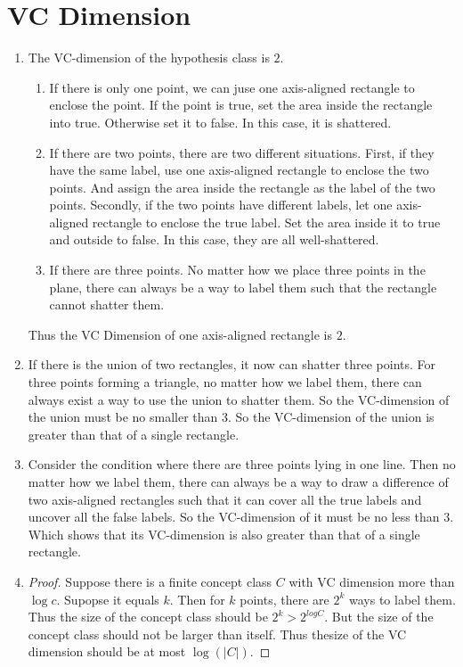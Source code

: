 \documentclass{article}
\begin{document}
	\section{VC Dimension}
		\begin{enumerate}
			\item The VC-dimension of the hypothesis class is $2$. \begin{enumerate}
				\item If there is only one point, we can juse one axis-aligned rectangle to enclose the point. If the point is true, set the area inside the rectangle into true. Otherwise set it to false. In this case, it is shattered.
				\item If there are two points, there are two different situations. First, if they have the same label, use one axis-aligned rectangle to enclose the two points. And assign the area inside the rectangle as the label of the two points. Secondly, if the two points have different labels, let one axis-aligned rectangle to enclose the true label. Set the area inside it to true and outside to false. In this case, they are all well-shattered.
				\item If there are three points. No matter how we place three points in the plane, there can always be a way to label them such that the rectangle cannot shatter them.	
				\end{enumerate}
			Thus the VC Dimension of one axis-aligned rectangle is $2$.
			\item If there is the union of two rectangles, it now can shatter three points. For three points forming a triangle, no matter how we label them, there can always exist a way to use the union to shatter them. So the VC-dimension of the union must be no smaller than $3$. So the VC-dimension of the union is greater than that of a single rectangle.
			\item Consider the condition where there are three points lying in one line. Then no matter how we label them, there can always be a way to draw a difference of two axis-aligned rectangles such that it can cover all the true labels and uncover all the false labels. So the VC-dimension of it must be no less than $3$. Which shows that its VC-dimension is also greater than that of a single rectangle.
			\item \begin{proof} Suppose there is a finite concept class $C$ with VC dimension more than $\log{c}$. Supopse it equals $k$. Then for $k$ points, there are $2^k$ ways to label them. Thus the size of the concept class should be $2^k > 2^{log{C}}$. But the size of the concept class should not be larger than itself. Thus thesize of the VC dimension should be at most $\log(|C|)$. \end{proof}
		\end{enumerate}
\end{document}
